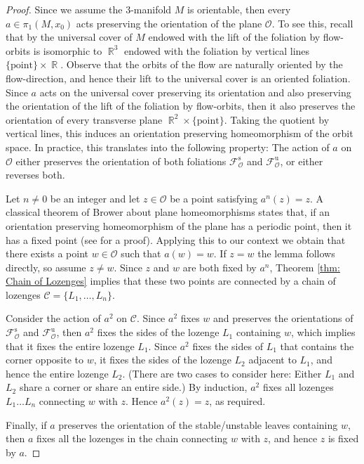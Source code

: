 \documentclass[12pt]{amsart}
\theoremstyle{definition}
\theoremstyle{remark}
\DeclareMathOperator{\R}{\mathbb{R}}
\renewcommand{\O}{\mathcal{O}}
\newcommand{\Fs}{\mathcal{F}^{\mathrm{s}}_\mathcal{O}}
\newcommand{\Fu}{\mathcal{F}^{\mathrm{u}}_\mathcal{O}}
\begin{document}
\begin{proof}
Since we assume the 3-manifold $M$ is orientable, then every $a\in\pi_1(M,x_0)$ acts preserving the orientation of the plane $\O$. To see this, recall that by \cite{Fenley1994AnosovFlows, Barbot1995Characterization} the universal cover of $M$ endowed with the lift of the foliation by flow-orbits is isomorphic to $\R^3$ endowed with the foliation by vertical lines $\{\text{point}\}\times\R$. Observe that the orbits of the flow are naturally oriented by the flow-direction, and hence their lift to the universal cover is an oriented foliation. Since $a$ acts on the universal cover preserving its orientation and also preserving the orientation of the lift of the foliation by flow-orbits, then it also preserves the orientation of every transverse plane $\R^2\times\{\text{point}\}$. Taking the quotient by vertical lines, this induces an orientation preserving homeomorphism of the orbit space. In practice, this translates into the following property: The action of $a$ on $\O$ either preserves the orientation of both foliations $\Fs$ and $\Fu$, or either reverses both. 


Let $n\neq 0$ be an integer and let $z\in\O$ be a point satisfying $a^n(z)=z$. A classical theorem of Brower about plane homeomorphisms states that, if an orientation preserving homeomorphism of the plane has a periodic point, then it has a fixed point (see \cite{Franks_BrowerThm} for a proof). Applying this to our context we obtain that there exists a point $w\in\O$ such that $a(w)=w$. If $z=w$ the lemma follows directly, so assume $z\neq w$. Since $z$ and $w$ are both fixed by $a^n$, Theorem \ref{thm: Chain of Lozenges} implies that these two points are connected by a chain of lozenges $\mathcal{C}=\{L_1,\dots,L_n\}$. 


Consider the action of $a^2$ on $\mathcal{C}$. Since $a^2$ fixes $w$ and preserves the orientations of $\Fs$ and $\Fu$, then $a^2$ fixes the sides of the lozenge $L_1$ containing $w$, which implies that it fixes the entire lozenge $L_1$. Since $a^2$ fixes the sides of $L_1$ that contains the corner opposite to $w$, it fixes the sides of the lozenge $L_2$ adjacent to $L_1$, and hence the entire lozenge $L_2$. (There are two cases to consider here: Either $L_1$ and $L_2$ share a corner or share an entire side.) By induction, $a^2$ fixes all lozenges $L_1\dots L_n$ connecting $w$ with $z$. Hence $a^2(z)=z$, as required. 


Finally, if $a$ preserves the orientation of the stable/unstable leaves containing $w$, then $a$ fixes all the lozenges in the chain connecting $w$ with $z$, and hence $z$ is fixed by $a$.
\end{proof}
\end{document}
